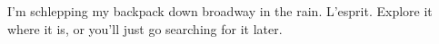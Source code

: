 

I'm schlepping my backpack down broadway in the rain.  L'esprit.
Explore it where it is, or you'll just go searching for it later.


\bye
